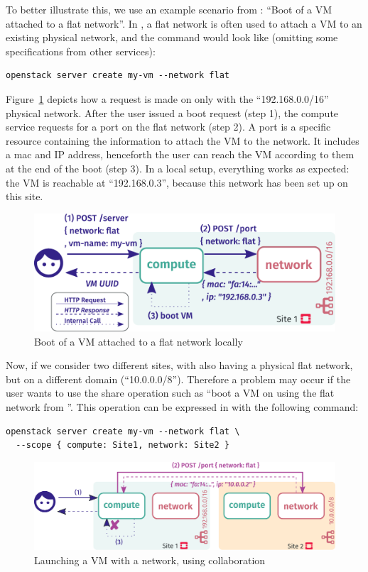 To better illustrate this, we use an example scenario from \os: ``Boot
of a VM attached to a flat network''.
%
In \os, a flat network is often used to attach a VM to an existing
physical network, and the command would look like (omitting some
specifications from other services):
\begin{lstlisting}[numbers=none]
openstack server create my-vm --network flat
\end{lstlisting}

%
Figure~\ref{fig:network-solo} depicts how a request is made on only
\sOne with the ``192.168.0.0/16'' physical network.
%
After the user issued a boot request (\textcolor{CbBlue}{step 1}), the compute service
requests for a port on the flat network (\textcolor{CbBlue}{step 2}).
%
A port is a specific resource containing the information to attach the
VM to the network.
%
It includes a mac and IP address, henceforth the user can reach the VM
according to them at the end of the boot (\textcolor{CbBlue}{step 3}).
%
In a local setup, everything works as expected: the VM is reachable at
``192.168.0.3'', because this network has been set up on this site.

\begin{figure}[htbp]
  \centering
  \includegraphics[width=.75\linewidth]{./figs/pdf/network-solo.pdf}
  \caption{Boot of a VM attached to a flat network locally }
  \label{fig:network-solo}
\end{figure}

Now, if we consider two different sites, with \sTwo also having a
physical flat network, but on a different domain (\ie ``10.0.0.0/8'').
%
Therefore a problem may occur if the user wants to use the share
operation such as ``boot a VM on \sOne using the flat network from
\sTwo''.
%
This operation can be expressed in \scl with the following command:
\begin{lstlisting}[numbers=none]
  openstack server create my-vm --network flat \
  --scope { compute: Site1, network: Site2 }
\end{lstlisting}

\begin{figure}[htbp]
  \centering
  \includegraphics[width=.9\linewidth]{./figs/pdf/network.pdf}
  \caption{Launching a VM with a network, using collaboration}
  \label{fig:network}
\end{figure}

